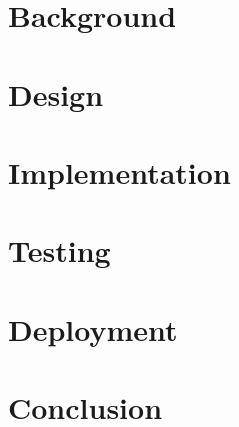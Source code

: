 \part{Background}




\part{Design}





\part{Implementation}


\part{Testing}


\part{Deployment}


\part{Conclusion}


